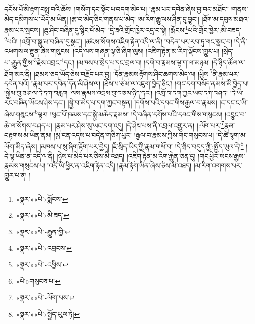 དངོས་པོ་མི་རྟག་བསླུ་བའི་ཆོས། །གསོག་དང་སྟོང་པ་བདག་མེད་པ། །རྣམ་པར་དབེན་ཞེས་བྱ་བར་མཐོང་། །གནས་མེད་དམིགས་པ་ཡོད་མ་ཡིན། །རྩ་བ་མེད་ཅིང་གནས་པ་མེད། །མ་རིག་རྒྱུ་ལས་ཤིན་དུ་བྱུང་། །ཐོག་མ་དབུས་མཐའ་རྣམ་པར་སྤངས། །ཆུ་ཤིང་བཞིན་དུ་སྙིང་པོ་མེད། །དྲི་ཟའི་གྲོང་ཁྱེར་འདྲ་བ་སྟེ། །རྨོངས་\footnote{«སྣར་»«པེ་»སྨོངས་}པའི་གྲོང་ཁྱེར་:མི་བཟད་\footnote{«སྣར་»«པེ་»མི་ཟད་}པའི། །འགྲོ་བ་སྒྱུ་མ་བཞིན་དུ་སྣང་། །ཚངས་སོགས་འཇིག་རྟེན་འདི་ལ་ནི། །བདེན་པར་རབ་ཏུ་གང་སྣང་བ། །དེ་ནི་འཕགས་ལ་རྫུན་ཞེས་གསུངས། །འདི་ལས་གཞན་ལྟ་ཅི་ཞིག་ལུས། །འཇིག་རྟེན་མ་རིག་ལྡོངས་གྱུར་པ། །སྲེད་པ་:རྒྱུན་གྱིས་\footnote{«སྣར་»«པེ་»རྒྱུན་གྱི་}རྗེས་འབྲང་\footnote{«སྣར་»«པེ་»འབྲངས་}དང་། །མཁས་པ་སྲེད་པ་དང་བྲལ་བ། །དགེ་བ་རྣམས་ལྟ་ག་ལ་མཉམ། །དེ་ཉིད་ཚོལ་ལ་ཐོག་མར་ནི། །ཐམས་ཅད་ཡོད་ཅེས་བརྗོད་པར་བྱ། །དོན་རྣམས་རྟོགས་ཤིང་ཆགས་མེད་ལ། །ཕྱིས་\footnote{«སྣར་»«པེ་»འཕྱིས་}ནི་རྣམ་པར་དབེན་པའོ། །རྣམ་པར་དབེན་དོན་མི་ཤེས་ལ། །ཐོས་པ་ཙམ་ལ་འཇུག་བྱེད་ཅིང་། །གང་དག་བསོད་ནམས་མི་བྱེད་པ། །སྐྱེས་བུ་ཐ་ཤལ་དེ་དག་བརླག །ལས་རྣམས་འབྲས་བུ་བཅས་ཉིད་དང་། །འགྲོ་བ་དག་ཀྱང་ཡང་དག་བཤད། །དེ་ཡི་རང་བཞིན་ཡོངས་ཤེས་དང་། །སྐྱེ་བ་མེད་པ་དག་ཀྱང་བསྟན། །དགོས་པའི་དབང་གིས་རྒྱལ་བ་རྣམས། །ང་དང་ང་ཡི་ཞེས་གསུངས་\footnote{«པེ་»གསུངས་པ་}ལྟར། །ཕུང་པོ་ཁམས་དང་སྐྱེ་མཆེད་རྣམས། །དེ་བཞིན་དགོས་པའི་དབང་གིས་གསུངས། །འབྱུང་བ་ཆེ་ལ་སོགས་བཤད་པ། །རྣམ་པར་ཤེས་སུ་ཡང་དག་འདུ། །དེ་ཤེས་པས་ནི་འབྲལ་འགྱུར་ན། །:ལོག་པར་\footnote{«སྣར་»«པེ་»ལོག་པས་}རྣམ་བརྟགས་མ་ཡིན་ནམ། །མྱ་ངན་འདས་པ་བདེན་གཅིག་པུར། །རྒྱལ་བ་རྣམས་ཀྱིས་གང་གསུངས་པ། །དེ་ཚེ་ལྷག་མ་ལོག་མིན་ཞེས། །མཁས་པ་སུ་ཞིག་རྟོག་པར་བྱེད། །ཇི་སྲིད་ཡིད་ཀྱི་རྣམ་གཡོ་བ། །དེ་སྲིད་བདུད་ཀྱི་:སྤྱོད་ཡུལ་དེ།\footnote{«སྣར་»«པེ་»སྤྱོད་ཡུལ་ཏེ།} །དེ་ལྟ་ཡིན་ན་འདི་ལ་ནི། །ཉེས་པ་མེད་པར་ཅིས་མི་འཐད། །འཇིག་རྟེན་མ་རིག་རྐྱེན་ཅན་དུ། །གང་ཕྱིར་སངས་རྒྱས་རྣམས་གསུངས་པ། །འདི་ཡི་ཕྱིར་ན་འཇིག་རྟེན་འདི། །རྣམ་རྟོག་ཡིན་ཞེས་ཅིས་མི་འཐད། །མ་རིག་འགགས་པར་གྱུར་པ་ན། །
